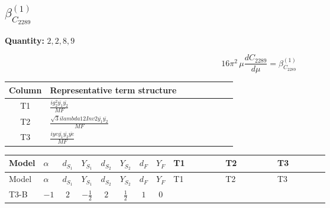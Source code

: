 \documentclass[8pt]{article}
\begin{document}
\begin{landscape}
\section*{$\beta_{C_{2289}}^{(1)}$}
\noindent\textbf{Quantity: }$\mathrm{2,2,8,9}$\par\smallskip
\[16\pi^2\,\mu\frac{d C_{2289}}{d\mu}=\beta_{C_{2289}}^{(1)}\]
\begin{center}
\begin{tabular}{@{}c >{\raggedright\arraybackslash}p{0.82\linewidth}@{}}
\toprule
Column & Representative term structure \\
\midrule
T1 & \(\displaystyle \frac{i g_{2}^{2} \overline{y_{1}} \overline{y_{2}}}{MF}\) \\
\midrule
T2 & \(\displaystyle \frac{\sqrt{3} i lambda12Inv2 \overline{y_{1}} \overline{y_{2}}}{MF}\) \\
\midrule
T3 & \(\displaystyle \frac{i ye \overline{y_{1}} \overline{y_{2}} \overline{ye}}{MF}\) \\
\midrule
\bottomrule
\end{tabular}
\end{center}
\smallskip
\tiny
\begin{longtable}{@{}llcccccc >{\raggedright\arraybackslash}p{0.21\linewidth} >{\raggedright\arraybackslash}p{0.21\linewidth} >{\raggedright\arraybackslash}p{0.21\linewidth}@{}}
\toprule
Model & $\alpha$ & $d_{S_1}$ & $Y_{S_1}$ & $d_{S_2}$ & $Y_{S_2}$ & $d_F$ & $Y_F$ & T1 & T2 & T3 \\
\midrule
\endfirsthead
\toprule
Model & $\alpha$ & $d_{S_1}$ & $Y_{S_1}$ & $d_{S_2}$ & $Y_{S_2}$ & $d_F$ & $Y_F$ & T1 & T2 & T3 \\
\midrule
\endhead
T3-B & $-1$ & $2$ & $-\frac{1}{2}$ & $2$ & $\frac{1}{2}$ & $1$ & $0$ & \scriptsize\adjustbox{max width=\linewidth}{$\begin{gathered} - \frac{3 i g_{2}^{2} \overline{y_{1}} \overline{y_{2}}}{4 MF}\end{gathered}$} & \scriptsize\adjustbox{max width=\linewidth}{$\begin{gathered} - \frac{\sqrt{3} i lambda12Inv2 \overline{y_{1}} \overline{y_{2}}}{3 MF}\end{gathered}$} & \scriptsize\adjustbox{max width=\linewidth}{$\begin{gathered} \frac{i ye \overline{y_{1}} \overline{y_{2}} \overline{ye}}{4 MF}\end{gathered}$} \\
\midrule
\bottomrule
\end{longtable}
\clearpage

\end{landscape}
\end{document}
